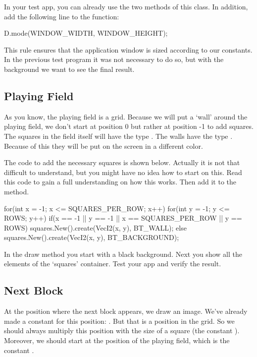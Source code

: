 In your test app, you can already use the two methods of this class. In addition, add the following line to the  function:

\begin{code}
D.mode(WINDOW_WIDTH, WINDOW_HEIGHT);
\end{code}

This rule ensures that the application window is sized according to our constants. In the previous test program it was not necessary to do so, but with the background we want to see the final result.

\subsection{Playing Field}

As you know, the playing field is a grid. Because we will put a `wall' around the playing field, we don't start at position 0 but rather at position -1 to add squares. The squares in the field itself will have the type . The walls have the type . Because of this they will be put on the screen in a different color.

The code to add the necessary squares is shown below. Actually it is not that difficult to understand, but you might have no idea how to start on this. Read this code to gain a full understanding on how this works. Then add it to the  method.

\begin{code}
for(int x = -1; x <= SQUARES_PER_ROW; x++)
{
  for(int y = -1; y <= ROWS; y++)
  {
    if(x == -1 || y == -1 || x == SQUARES_PER_ROW || y == ROWS)
    {
      squares.New().create(VecI2(x, y), BT_WALL);
    } else {
      squares.New().create(VecI2(x, y), BT_BACKGROUND);
    }
  }
}
\end{code}

In the draw method you start with a black background. Next you show all the elements of the `squares' container. Test your app and verify the result.

\subsection{Next Block}
At the position where the next block appears, we draw an image. We've already made a constant for this position: . But that is a position in the grid. So we should always multiply this position with the size of a square (the constant ). Moreover, we should start at the position of the playing field, which is the constant .


